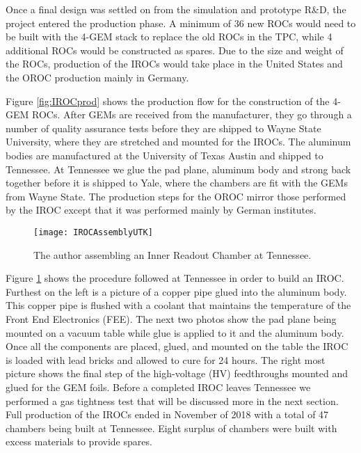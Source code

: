 Once a final design was settled on from the simulation and prototype R\&D, the project entered the production phase.  A minimum of 36 new ROCs would need to be built with the 4-GEM stack to replace the old ROCs in the TPC, while 4 additional ROCs would be constructed as spares.  Due to the size and weight of the ROCs, production of the IROCs would take place in the United States and the OROC production mainly in Germany. 


\noindent
Figure \ref{fig:IROCprod} shows the production flow for the construction of the 4-GEM ROCs.  After GEMs are received from the manufacturer, they go through a number of quality assurance tests before they are shipped to Wayne State University, where they are stretched and mounted for the IROCs.   The aluminum bodies are manufactured at the University of Texas Austin and shipped to Tennessee.  At Tennessee we glue the pad plane, aluminum body and strong back together before it is shipped to Yale, where the chambers are fit with the GEMs from Wayne State.  The production steps for the OROC mirror those performed by the IROC except that it was performed mainly by German institutes.

\begin{figure}[h!]
\texttt{[image: IROCAssemblyUTK]}
\centering
\caption{The author assembling an Inner Readout Chamber at Tennessee. }
\label{fig:IROCassm}
\end{figure}

Figure \ref{fig:IROCassm} shows the procedure followed at Tennessee in order to build an IROC.  Furthest on the left is a picture of a copper pipe glued into the aluminum body.  This copper pipe is flushed with a coolant that maintains the temperature of the Front End Electronics (FEE).  The next two photos show the pad plane being mounted on a vacuum table while glue is applied to it and the aluminum body.  Once all the components are placed, glued, and mounted on the table the IROC is loaded with lead bricks and allowed to cure for 24 hours.  The right most picture shows the final step of the high-voltage (HV) feedthroughs mounted and glued for the GEM foils.  Before a completed IROC leaves Tennessee we performed a gas tightness test that will be discussed more in the next section.  Full production of the IROCs ended in November of 2018 with a total of 47 chambers being built at Tennessee.  Eight surplus of chambers were built with excess materials to provide spares.

